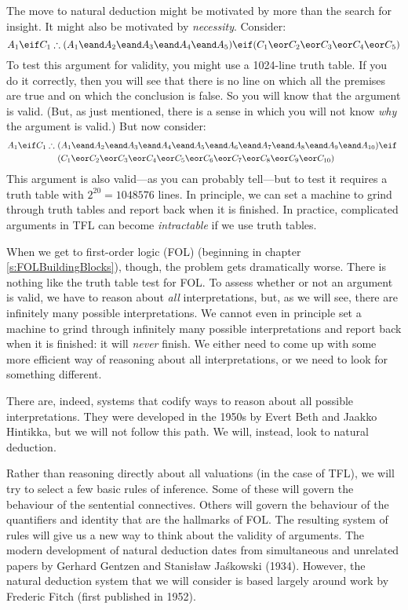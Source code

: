 The move to natural deduction might be motivated by more than the search for insight. It might also be motivated by \emph{necessity}. Consider:
$$A_1 \eif C_1 \therefore (A_1 \eand A_2 \eand A_3 \eand A_4 \eand A_5) \eif (C_1 \eor C_2 \eor C_3 \eor C_4 \eor C_5)$$
To test this argument for validity, you might use a 1024-line truth table. If you do it correctly, then you will see that there is no line on which all the premises are true and on which the conclusion is false. So you will know that the argument is valid. (But, as just mentioned, there is a sense in which you will not know \emph{why} the argument is valid.) But now consider:
\begin{align*}
A_1 \eif C_1 \therefore\ & (A_1 \eand A_2 \eand A_3 \eand A_4 \eand A_5 \eand A_6 \eand A_7 \eand A_8 \eand A_9 \eand A_{10}) \eif \phantom{(}\\
&(C_1 \eor C_2 \eor C_3 \eor C_4 \eor C_5 \eor C_6 \eor C_7 \eor C_8 \eor C_9 \eor C_{10})
\end{align*}
This argument is also valid---as you can probably tell---but to test it requires a truth table with $2^{20} = 1048576$ lines. In principle, we can set a machine to grind through truth tables and report back when it is finished. In practice, complicated arguments in TFL can become \emph{intractable} if we use truth tables.

When we get to first-order logic (FOL) (beginning in chapter \ref{s:FOLBuildingBlocks}), though, the problem gets dramatically worse. There is nothing like the truth table test for FOL. To assess whether or not an argument is valid, we have to reason about \emph{all} interpretations, but, as we will see, there are infinitely many possible interpretations. We cannot even in principle set a machine to grind through infinitely many possible interpretations and report back when it is finished: it will \emph{never} finish. We either need to come up with some more efficient way of reasoning about all interpretations, or we need to look for something different.

There are, indeed, systems that codify ways to reason about all possible interpretations. They were developed in the 1950s by Evert Beth and Jaakko Hintikka, but we will not follow this path. We will, instead, look to natural deduction.

Rather than reasoning directly about all valuations (in the case of TFL), we will try to select a few basic rules of inference. Some of these will govern the behaviour of the sentential connectives. Others will govern the behaviour of the quantifiers and identity that are the hallmarks of FOL. The resulting system of rules will give us a new way to think about the validity of arguments.
The modern development of natural deduction dates from simultaneous and unrelated papers by Gerhard Gentzen and Stanis\l{}aw Ja\'{s}kowski (1934). However, the natural deduction system that we will consider is based largely around work by Frederic Fitch (first published in 1952).



